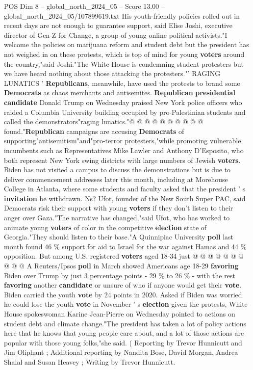 \begin{textsample}{POS Dim 8 – global\_north\_2024\_05 – Score 13.00 – global\_north\_2024\_05/107899619.txt}
His youth-friendly policies rolled out in recent days are not enough to guarantee support, said Elise Joshi, executive director of Gen-Z for Change, a group of young online political activists."I welcome the policies on marijuana reform and student debt but the president has not weighed in on these protests, which is top of mind for young \textbf{voters} around the country,"said Joshi."The White House is condemning student protesters but we have heard nothing about those attacking the protesters."' RAGING LUNATICS ' \textbf{Republicans}, meanwhile, have used the protests to brand some \textbf{Democrats} as chaos merchants and antisemites. \textbf{Republican} \textbf{presidential} \textbf{candidate} Donald Trump on Wednesday praised New York police officers who raided a Columbia University building occupied by pro-Palestinian students and called the demonstrators"raging lunatics."@ @ @ @ @ @ @ @ @ @ found."\textbf{Republican} campaigns are accusing \textbf{Democrats} of supporting"antisemitism"and"pro-terror protesters,"while promoting vulnerable incumbents such as Representatives Mike Lawler and Anthony D'Esposito, who both represent New York swing districts with large numbers of Jewish \textbf{voters}.
Biden has not visited a campus to discuss the demonstrations but is due to deliver commencement addresses later this month, including at Morehouse College in Atlanta, where some students and faculty asked that the president ' s \textbf{invitation} be withdrawn.
Ns?
Ufot, founder of the New South Super PAC, said Democrats risk their support with young \textbf{voters} if they don't listen to their anger over Gaza."The narrative has changed,"said Ufot, who has worked to animate young \textbf{voters} of color in the competitive \textbf{election} state of Georgia."They should listen to their base."A Quinnipiac University \textbf{poll} last month found 46 \% support for aid to Israel for the war against Hamas and 44 \% opposition.
But among U.S. registered \textbf{voters} aged 18-34 just @ @ @ @ @ @ @ @ @ @ A Reuters/Ipsos \textbf{poll} in March showed Americans age 18-29 \textbf{favoring} Biden over Trump by just 3 percentage points - 29 \% to 26 \% - with the rest \textbf{favoring} another \textbf{candidate} or unsure of who if anyone would get their \textbf{vote}.
Biden carried the youth \textbf{vote} by 24 points in 2020.
Asked if Biden was worried he could lose the youth \textbf{vote} in November ' s \textbf{election} given the protests, White House spokeswoman Karine Jean-Pierre on Wednesday pointed to actions on student debt and climate change."The president has taken a lot of policy actions here that he knows that young people care about, and a lot of those actions are popular with those young folks,"she said. ( Reporting by Trevor Hunnicutt and Jim Oliphant ; Additional reporting by Nandita Bose, David Morgan, Andrea Shalal and Susan Heavey ; Writing by Trevor Hunnicutt.

\end{textsample}
